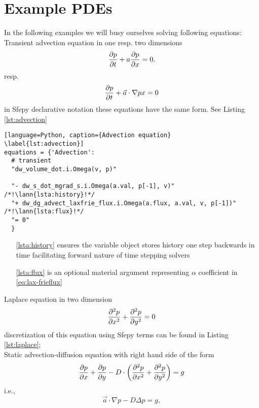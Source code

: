 \section{Example PDEs}
In the following examples we will busy ourselves solving following equations:\\
Transient advection equation in one resp. two dimensions
\begin{equation}
	\label{eq:ex_advection}
	\frac{\partial p}{\partial t} + a\frac{\partial p}{\partial x} = 0.
\end{equation}
resp.
\begin{equation}
	\frac{\partial p}{\partial t} + \vec{a}\cdot\nabla{p}{x} = 0
\end{equation}
in Sfepy declarative notation these equations have the same form. See Listing 
\ref{lst:advection}
\setcounter{lstannotation}{0}
\begin{lstlisting}[language=Python, caption={Advection equation}
\label{lst:advection}]
equations = {'Advection': 
  # transient
  "dw_volume_dot.i.Omega(v, p)"
 
  "- dw_s_dot_mgrad_s.i.Omega(a.val, p[-1], v)" /*!\lann{lsta:history}!*/
  "+ dw_dg_advect_laxfrie_flux.i.Omega(a.flux, a.val, v, p[-1])"  /*!\lann{lsta:flux}!*/
  "= 0"
  }
\end{lstlisting}
\begin{itemize}
	\item[\ref{lsta:history}]  ensures the variable object stores 
	history one step backwards in time facilitating forward nature of time stepping 
	solvers
	\item[\ref{lsta:flux}]  is an optional material argument 
	representing $\alpha$ coefficient in \eqref{eq:lax-frieflux}
\end{itemize}
Laplace equation in two dimension
\begin{equation}
	\label{eq:ex_laplace}
	\frac{\partial^2 p}{\partial x^2} + \frac{\partial^2 p}{\partial y^2} = 0
\end{equation}
discretization of this equation using Sfepy terms can be found in Listing 
\ref{lst:laplace};\\
Static advection-diffusion equation with right hand side of the form
\begin{equation}
\label{eq:ex_advdiff}
\frac{\partial p}{\partial x} + \frac{\partial p}{\partial y} - D \cdot \left( \frac{\partial^2 p}{\partial x^2} + \frac{\partial^2 
p}{\partial y^2} \right) = g
\end{equation}
i.e.,
\begin{equation}
\vec{a} \cdot \nabla p - D \Delta p = g,
\end{equation}
